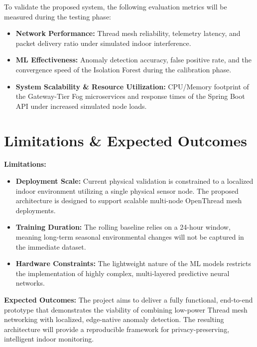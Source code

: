 \documentclass[10pt,a4paper]{article}
\begin{document}
To validate the proposed system, the following evaluation metrics will be measured
during the testing phase:

\begin{itemize}
  \item \textbf{Network Performance:} Thread mesh reliability, telemetry latency, and
    packet delivery ratio under simulated indoor interference.
  \item \textbf{ML Effectiveness:} Anomaly detection accuracy, false positive rate, and
    the convergence speed of the Isolation Forest during the calibration phase.
  \item \textbf{System Scalability \& Resource Utilization:} CPU/Memory footprint of
    the Gateway-Tier Fog microservices and response times of the Spring Boot API under
    increased simulated node loads.
\end{itemize}

\section{Limitations \& Expected Outcomes}

\textbf{Limitations:}
\begin{itemize}
  \item \textbf{Deployment Scale:} Current physical validation is constrained to a
    localized indoor environment utilizing a single physical sensor node. The proposed
    architecture is designed to support scalable multi-node OpenThread mesh deployments.
  \item \textbf{Training Duration:} The rolling baseline relies on a 24-hour window,
    meaning long-term seasonal environmental changes will not be captured in the
    immediate dataset.
  \item \textbf{Hardware Constraints:} The lightweight nature of the ML models restricts
    the implementation of highly complex, multi-layered predictive neural networks.
\end{itemize}

\textbf{Expected Outcomes:}
The project aims to deliver a fully functional, end-to-end prototype that demonstrates
the viability of combining low-power Thread mesh networking with localized, edge-native
anomaly detection. The resulting architecture will provide a reproducible framework for
privacy-preserving, intelligent indoor monitoring.

\end{document}
